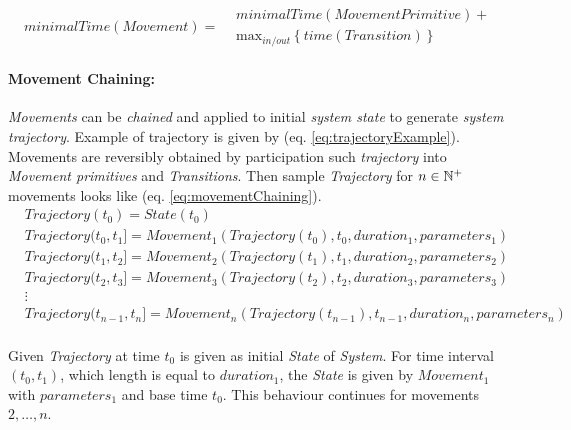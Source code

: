     \begin{equation}\label{eq:minimalMovementTime}
        minimalTime(Movement)=
        \begin{aligned}
        &minimalTime(MovementPrimitive) +\\ &\text{max}_{in/out}\left\{time(Transition)\right\}
        \end{aligned}
    \end{equation}
   
    \paragraph{Movement Chaining:}\emph{Movements} can be \emph{chained} and applied to initial \emph{system state} to generate \emph{system trajectory}. Example of trajectory is given by (eq. \ref{eq:trajectoryExample}). Movements are reversibly obtained by participation such \emph{trajectory} into \emph{Movement primitives} and \emph{Transitions}. Then sample \emph{Trajectory} for $n\in \mathbb{N}^+$ movements looks like (eq. \ref{eq:movementChaining}).
    \begin{equation}\label{eq:movementChaining}
        \begin{aligned}
        &Trajectory(t_0)=State(t_0)\\
        &Trajectory(t_0,t_1]=Movement_1(Trajectory(t_0),t_0,duration_1,parameters_1)\\
        &Trajectory(t_1,t_2]=Movement_2(Trajectory(t_1),t_1,duration_2,parameters_2)\\
        &Trajectory(t_2,t_3]=Movement_3(Trajectory(t_2),t_2,duration_3,parameters_3)\\
        &\vdots\\
        &Trajectory(t_{n-1},t_n]=Movement_n(Trajectory(t_{n-1}),t_{n-1},duration_n,parameters_n)\\
        \end{aligned}
    \end{equation}

    Given \emph{Trajectory} at time $t_0$ is given as initial \emph{State} of \emph{System}. For time interval $(t_0,t_1)$, which length is equal to $duration_1$, the \emph{State} is given by $Movement_1$ with $parameters_1$ and base time $t_0$. This behaviour continues for movements $2,\dots,n$. 

